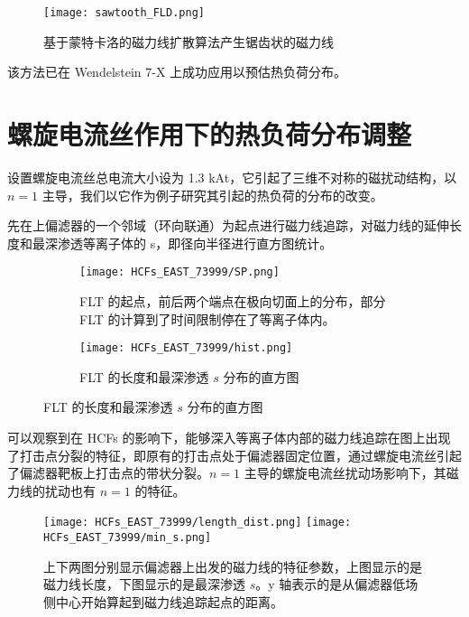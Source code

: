 \begin{figure}[htbp]
    \centering
    \texttt{[image: sawtooth\_FLD.png]}
    \caption{基于蒙特卡洛的磁力线扩散算法产生锯齿状的磁力线}
\end{figure}




该方法已在 Wendelstein 7-X 上成功应用以预估热负荷分布。

\section{螺旋电流丝作用下的热负荷分布调整}

设置螺旋电流丝总电流大小设为 1.3 kAt，它引起了三维不对称的磁扰动结构，以 $n=1$ 主导，我们以它作为例子研究其引起的热负荷的分布的改变。
  
先在上偏滤器的一个邻域（环向联通）为起点进行磁力线追踪，对磁力线的延伸长度和最深渗透等离子体的 s，即径向半径进行直方图统计。

\begin{figure}[htbp]
  \centering
  
  \begin{subfigure}{0.4\textwidth}
    \texttt{[image: HCFs\_EAST\_73999/SP.png]}
    \caption{FLT 的起点，前后两个端点在极向切面上的分布，部分 FLT 的计算到了时间限制停在了等离子体内。}
  \end{subfigure}%
  \begin{subfigure}{0.57\textwidth}
    \texttt{[image: HCFs\_EAST\_73999/hist.png]}
    \caption{FLT 的长度和最深渗透 $s$ 分布的直方图}
  \end{subfigure}%
\end{figure}



可以观察到在 HCFs 的影响下，能够深入等离子体内部的磁力线追踪在图上出现了打击点分裂的特征，即原有的打击点处于偏滤器固定位置，通过螺旋电流丝引起了偏滤器靶板上打击点的带状分裂。$n=1$ 主导的螺旋电流丝扰动场影响下，其磁力线的扰动也有 $n=1$ 的特征。

\begin{figure}[htbp]
  \centering%
      \texttt{[image: HCFs\_EAST\_73999/length\_dist.png]}
      \texttt{[image: HCFs\_EAST\_73999/min\_s.png]}
      \caption{上下两图分别显示偏滤器上出发的磁力线的特征参数，上图显示的是磁力线长度，下图显示的是最深渗透 $s$。y 轴表示的是从偏滤器低场侧中心开始算起到磁力线追踪起点的距离。}
\end{figure}

